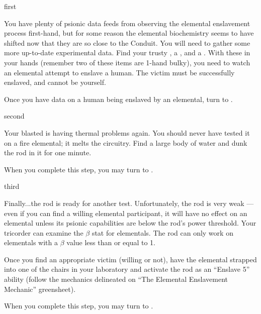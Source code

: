 \documentclass[notebook]{elementals}
\begin{document}

\startnotebook{\nEnslavementResearch{}}

\begin{page}{first}

You have plenty of psionic data feeds from observing the elemental enslavement process first-hand, but for some reason the elemental biochemistry seems to have shifted now that they are so close to the Conduit. You will need to gather	 some more up-to-date experimental data. Find your trusty \iTricorder{}, a \iPhotodiode{}, and a \iCoffeeMug{}. With these in your hands (remember two of these items are 1-hand bulky), you need to watch an elemental attempt to enslave a human. The victim must be successfully enslaved, and cannot be yourself.

Once you have data on a human being enslaved by an elemental, turn to .

\end{page}

\begin{page}{second}

Your blasted \iControlRod{} is having thermal problems again. You should never have tested it on a fire elemental; it melts the circuitry. Find a large body of water and dunk the rod in it for one minute.

When you complete this step, you may turn to .

\end{page}

\begin{page}{third}

Finally...the rod is ready for another test. Unfortunately, the rod is very weak --- even if you can find a willing elemental participant, it will have no effect on an elemental unless its psionic capabilities are below the rod's power threshold. Your tricorder can examine the $\beta$ stat for elementals. The rod can only work on elementals with a $\beta$ value less than or equal to 1.

Once you find an appropriate victim (willing or not), have the elemental strapped into one of the chairs in your laboratory and activate the rod as an ``Enslave 5'' ability (follow the mechanics delineated on ``The Elemental Enslavement Mechanic'' greensheet).

When you complete this step, you may turn to .

\end{page}
\end{document}
